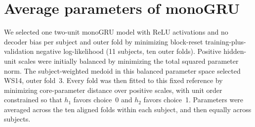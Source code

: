 \documentclass[10pt,a4paper]{article}
\begin{document}
\section*{Average parameters of monoGRU}
We selected one two-unit monoGRU model with ReLU activations and no decoder bias per subject and outer fold by minimizing block-reset training-plus-validation negative log-likelihood (11 subjects, ten outer folds). Positive hidden-unit scales were initially balanced by minimizing the total squared parameter norm. The subject-weighted medoid in this balanced parameter space selected WS14, outer fold~3. Every fold was then fitted to this fixed reference by minimizing core-parameter distance over positive scales, with unit order constrained so that $h_1$ favors choice~0 and $h_2$ favors choice~1. Parameters were averaged across the ten aligned folds within each subject, and then equally across subjects.
\end{document}
